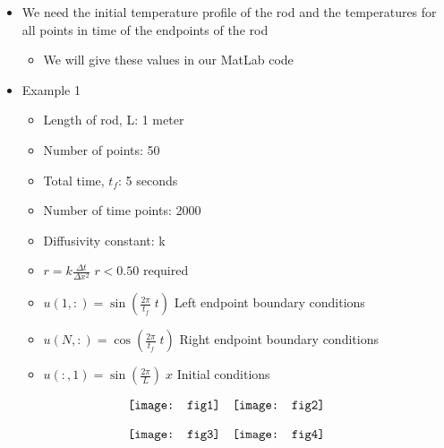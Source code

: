 \documentclass[compress]{beamer}
\begin{document}
\begin{frame}
\begin{itemize}
\item We need the initial temperature profile of the rod and the temperatures for all points in time of the endpoints of the rod
\begin{itemize}
\item We will give these values in our MatLab code
\end{itemize}
\item Example 1
\begin{itemize}
\item Length of rod, L:		1 meter 
\item Number of points:		50 
\item Total time, $t_f$:	5 seconds 
\item Number of time points:	2000 
\item Diffusivity constant:		k
\item $r=k\frac{\Delta t}{\Delta x^2}$ \hspace{.5in}$r<0.50$ required
\item $u(1,:)=\sin \left(\frac{2\pi}{t_f}\;t\right)$ \hspace{.5in} Left endpoint boundary conditions
\item $u(N,:)=\cos \left(\frac{2\pi}{t_f}\;t\right)$ \hspace{.5in}Right endpoint boundary conditions
\item $u(:,1)=\sin \left(\frac{2\pi}{L}\right)\;x$ \hspace{.5in}Initial conditions
\end{itemize}
\end{itemize}
\end{frame}

\begin{frame}
\[
\begin{array}{c c}
\texttt{[image: fig1]} 	&	\texttt{[image: fig2]}	
\end{array}	
\]
\end{frame}

\begin{frame}
\[
\begin{array}{c c}
\texttt{[image: fig3]}	&\texttt{[image: fig4]}	
\end{array}	
\]
\end{frame} 

 	
\end{document}
